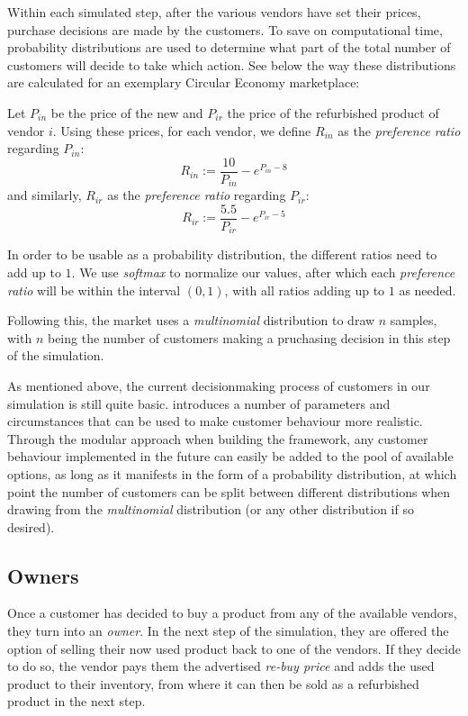 Within each simulated step, after the various vendors have set their prices, purchase decisions are made by the customers. To save on computational time, probability distributions are used to determine what part of the total number of customers will decide to take which action. See below the way these distributions are calculated for an exemplary Circular Economy marketplace:

\begin{definition}\label{def:customerDecisions}
	Let \(P_{in}\) be the price of the new and \(P_{ir}\) the price of the refurbished product of vendor \(i\). Using these prices, for each vendor, we define \(R_{in}\) as the \emph{preference ratio} regarding \(P_{in}\):
	\[
		R_{in} := \frac{10}{P_{in}} - e^{P_{in} - 8}
	\]
	and similarly, \(R_{ir}\) as the \emph{preference ratio} regarding \(P_{ir}\):
	\[
		R_{ir} := \frac{5.5}{P_{ir}} - e^{P_{ir} - 5}
	\]
\end{definition}


In order to be usable as a probability distribution, the different ratios need to add up to \(1\). We use \emph{softmax} to normalize our values, after which each \emph{preference ratio} will be within the interval \((0,1)\), with all ratios adding up to \(1\) as needed.

Following this, the market uses a \emph{multinomial} distribution to draw \(n\) samples, with \(n\) being the number of customers making a pruchasing decision in this step of the simulation.

As mentioned above, the current decisionmaking process of customers in our simulation is still quite basic.  introduces a number of parameters and circumstances that can be used to make customer behaviour more realistic. Through the modular approach when building the framework, any customer behaviour implemented in the future can easily be added to the pool of available options, as long as it manifests in the form of a probability distribution, at which point the number of customers can be split between different distributions when drawing from the \emph{multinomial} distribution (or any other distribution if so desired).

\subsection*{Owners}

Once a customer has decided to buy a product from any of the available vendors, they turn into an \emph{owner}. In the next step of the simulation, they are offered the option of selling their now used product back to one of the vendors. If they decide to do so, the vendor pays them the advertised \emph{re-buy price} and adds the used product to their inventory, from where it can then be sold as a refurbished product in the next step.

